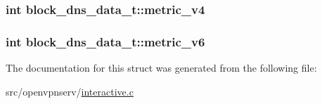 \subsubsection[{metric\+\_\+v4}]{\setlength{\rightskip}{0pt plus 5cm}int block\+\_\+dns\+\_\+data\+\_\+t\+::metric\+\_\+v4}\label{structblock__dns__data__t_a280851190c1998268fc3c69d14c50c69}
\hypertarget{structblock__dns__data__t_a67bdfe74f6a138956b2b35afd97d5273}{}
\subsubsection[{metric\+\_\+v6}]{\setlength{\rightskip}{0pt plus 5cm}int block\+\_\+dns\+\_\+data\+\_\+t\+::metric\+\_\+v6}\label{structblock__dns__data__t_a67bdfe74f6a138956b2b35afd97d5273}


The documentation for this struct was generated from the following file\+:\begin{DoxyCompactItemize}
\item 
src/openvpnserv/\hyperlink{interactive_8c}{interactive.\+c}\end{DoxyCompactItemize}
